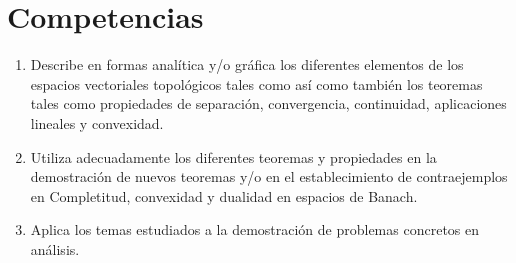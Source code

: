 \section{Competencias}

\begin{enumerate}[label=\arabic*., font=\bfseries, nosep]
      \item

            Describe en formas analítica y/o gráfica los diferentes
            elementos de los espacios vectoriales topológicos tales
            como así como también los teoremas tales como propiedades
            de separación, convergencia, continuidad, aplicaciones
            lineales y convexidad.

      \item

            Utiliza adecuadamente los diferentes teoremas y
            propiedades en la demostración de nuevos teoremas y/o en
            el establecimiento de contraejemplos en Completitud,
            convexidad y dualidad en espacios de Banach.

      \item

            Aplica los temas estudiados a la demostración de
            problemas concretos en análisis.
\end{enumerate}